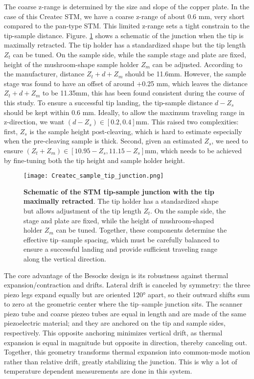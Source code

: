 The coarse z-range is determined by the size and slope of the copper plate. In the case of this Createc \ac{STM}, we have a coarse z-range of about 0.6 mm, very short compared to the pan-type STM. This limited z-range sets a tight constrain to the tip-sample distance. Figure. \ref{fig:Createc-tip-sample-junction} shows a schematic of the junction when the tip is maximally retracted. The tip holder has a standardized shape but the tip length $Z_t$ can be tuned. On the sample side, while the sample stage and plate are fixed, height of the mushroom-shape sample holder $Z_m$ can be adjusted. According to the manufacturer, distance $Z_t + d +Z_m$ should be 11.6mm. However, the sample stage was found to have an offset of around +0.25 mm, which leaves the distance $Z_t + d +Z_m$ to be 11.35mm, this has been found consistent during the course of this study. To ensure a successful tip landing, the tip-sample distance $d-Z_s$ should be kept within 0.6 mm. Ideally, to allow the maximum traveling range in z-direction, we want $(d-Z_s) \in [0.2,0.4]$mm. This raised two complexities: first, $Z_s$ is the sample height post-cleaving, which is hard to estimate especially when the pre-cleaving sample is thick. Second, given an estimated $Z_s$, we need to ensure $(Z_t+Z_m)\in[10.95-Z_s, 11.15-Z_s]$mm, which needs to be achieved by fine-tuning both the tip height and sample holder height.  

\begin{figure}
	\centering
	\texttt{[image: Createc\_sample\_tip\_junction.png]}
	\caption[\textbf{Schematic of the STM tip-sample junction with the tip maximally retracted}]{\textbf{Schematic of the STM tip-sample junction with the tip maximally retracted}. The tip holder has a standardized shape but allows adjustment of the tip length $Z_t$. On the sample side, the stage and plate are fixed, while the height of mushroom-shaped holder $Z_m$ can be tuned. Together, these components determine the effective tip–sample spacing, which must be carefully balanced to ensure a successful landing and provide sufficient traveling range along the vertical direction.}
	\label{fig:Createc-tip-sample-junction}
\end{figure}

The core advantage of the Besocke design is its robustness against thermal expansion/contraction and drifts. Lateral drift is canceled by symmetry: the three piezo legs expand equally but are oriented 120° apart, so their outward shifts sum to zero at the geometric center where the tip–sample junction sits. The scanner piezo tube and coarse piezeo tubes are equal in length and are made of the same piezoelectric material; and they are anchored on the tip and sample sides, respectively. This opposite anchoring minimizes vertical drift, as thermal expansion is equal in magnitude but opposite in direction, thereby canceling out. Together, this geometry transforms thermal expansion into common-mode motion rather than relative drift, greatly stabilizing the junction. This is why a lot of temperature dependent measurements are done in this system\cite{chiScanningTunnelingSpectroscopy2012}. 

